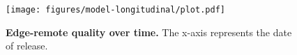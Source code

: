 


\begin{figure}[h!]
    \centering
    \texttt{[image: figures/model-longitudinal/plot.pdf]}
    \caption{\textbf{Edge-remote quality over time.} The x-axis represents the date of release.
}
    \label{fig:model-longitudinal}
  \end{figure}


